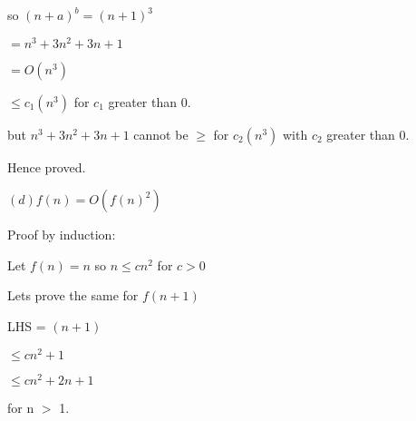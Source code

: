 \documentclass[letterpaper,portrait,12pt]{article}
\begin{document}
\begin{flushleft}
so $(n + a)^b =(n+1)^3$
\end{flushleft}


\begin{flushleft}
$=n^3+3n^2+3n+1$
\end{flushleft}


\begin{flushleft}
$=O(n^3)$
\end{flushleft}


\begin{flushleft}
$\le c_1(n^3)$ for $c_1$ greater than 0.
\end{flushleft}


\begin{flushleft}
but $n^3+3n^2+3n+1$ cannot be $\ge$ for $c_2(n^3)$ with $c_2$ greater than 0.
\end{flushleft}


\begin{flushleft}
Hence proved.
\end{flushleft}


\begin{flushleft}
$(d) f (n) = O(f (n)^2 )$
\end{flushleft}


\begin{flushleft}
Proof by induction:
\end{flushleft}


\begin{flushleft}
Let $f(n)=n$ so $n \le cn^2$ for $c \gt 0$
\end{flushleft}


\begin{flushleft}

\end{flushleft}


\begin{flushleft}
Lets prove the same for $f(n+1)$
\end{flushleft}


\begin{flushleft}
LHS 	= $(n+1)$
\end{flushleft}


\begin{flushleft}
	$\le cn^2+1$
\end{flushleft}


\begin{flushleft}
	$\le cn^2+2n+1$
\end{flushleft}


\begin{flushleft}
	for n $>$ 1.
\end{flushleft}
\end{document}
